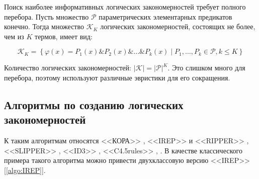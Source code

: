 \documentclass[12pt]{article}
\begin{document}

Поиск наиболее информативных логических закономерностей требует
полного перебора. Пусть множество \(\mathcal{P}\) параметрических
элементарных предикатов конечно. Тогда множество \(\mathcal{K}_K\)
логических закономерностей, состоящих не более, чем из \(K\) термов,
имеет вид:

\[
\mathcal{K}_K =
\left\{
 \varphi(x) = P_1(x) \& P_2(x) \& \dots \& P_k(x) \mid
  P_1, \dots, P_k \in \mathcal{P}, k \leq K
\right\}
\]

Количество логических закономерностей: \(\lvert \mathcal{K} \rvert =
\lvert \mathcal{P} \rvert^{K}\). Это слишком много для перебора,
поэтому используют различные эвристики для его сокращения.



\subsection{Алгоритмы по созданию логических закономерностей}

К таким алгоритмам относятся <<КОРА>> \cite{vainzvaig73kora}, <<IREP>>
и <<RIPPER>> \cite{cohen95fast}, <<SLIPPER>> \cite{cohen99simple},
<<ID3>> \cite{quinlan86induction}, <<C4.5rules>>
\cite{quinlan93programs}, \cite{quinlan96bagging}.  В качестве
классического примера такого алгоритма можно привести двухклассовую
версию <<IREP>> [\ref{algo:IREP}].
\end{document}
